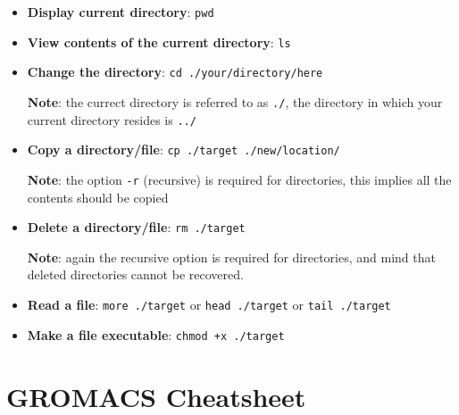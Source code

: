 \documentclass[]{article}
\begin{document}
\begin{itemize}
\item \textbf{Display current directory}: \texttt{pwd}

\item \textbf{View contents of the current directory}: \texttt{ls}

\item \textbf{Change the directory}: \texttt{cd ./your/directory/here}

\textbf{Note}: the currect directory is referred to as \texttt{./}, the directory in which your current directory resides is \texttt{../}

\item \textbf{Copy a directory/file}: \texttt{cp ./target ./new/location/}

\textbf{Note}: the option \texttt{-r} (recursive) is required for directories, this implies all the contents should be copied

\item \textbf{Delete a directory/file}: \texttt{rm ./target}

\textbf{Note}: again the recursive option is required for directories, and mind that deleted directories cannot be recovered.

\item \textbf{Read a file}: \texttt{more ./target} or \texttt{head ./target} or \texttt{tail ./target}

\item \textbf{Make a file executable}: \texttt{chmod +x ./target}
\end{itemize}

\newpage
\section*{GROMACS Cheatsheet}
\end{document}
